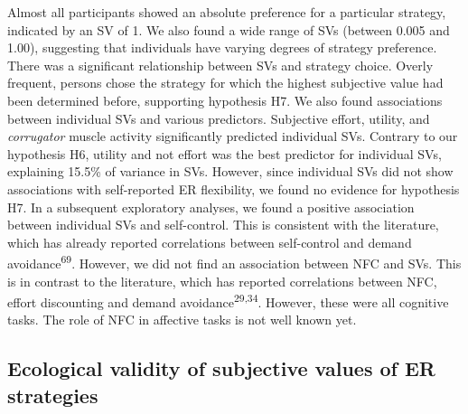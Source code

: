 \documentclass[
  man,floatsintext]{apa6}
\begin{document}
Almost all participants showed an absolute preference for a particular strategy, indicated by an SV of 1.
We also found a wide range of SVs (between 0.005 and 1.00), suggesting that individuals have varying degrees of strategy preference.
There was a significant relationship between SVs and strategy choice.
Overly frequent, persons chose the strategy for which the highest subjective value had been determined before, supporting hypothesis H7.
We also found associations between individual SVs and various predictors.
Subjective effort, utility, and \emph{corrugator} muscle activity significantly predicted individual SVs.
Contrary to our hypothesis H6, utility and not effort was the best predictor for individual SVs, explaining 15.5\% of variance in SVs.
However, since individual SVs did not show associations with self-reported ER flexibility, we found no evidence for hypothesis H7.
In a subsequent exploratory analyses, we found a positive association between individual SVs and self-control.
This is consistent with the literature, which has already reported correlations between self-control and demand avoidance\textsuperscript{69}.
However, we did not find an association between NFC and SVs.
This is in contrast to the literature, which has reported correlations between NFC, effort discounting and demand avoidance\textsuperscript{29,34}.
However, these were all cognitive tasks. The role of NFC in affective tasks is not well known yet.

\hypertarget{ecological-validity-of-subjective-values-of-er-strategies}{%
\subsection{Ecological validity of subjective values of ER strategies}\label{ecological-validity-of-subjective-values-of-er-strategies}}
\end{document}
